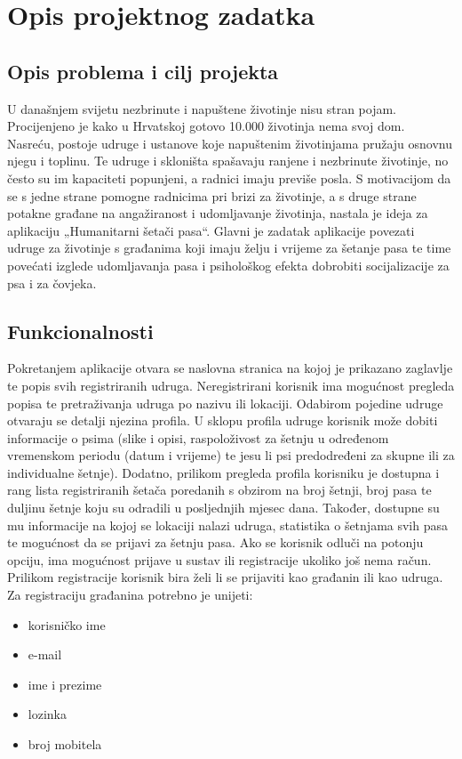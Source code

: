 \chapter{Opis projektnog zadatka}
		
		\section{Opis problema i cilj projekta}
		U današnjem svijetu nezbrinute i napuštene životinje nisu stran pojam. Procijenjeno je kako u Hrvatskoj gotovo 10.000 životinja nema svoj dom. Nasreću, postoje udruge i ustanove koje napuštenim životinjama pružaju osnovnu njegu i toplinu. Te udruge i skloništa spašavaju ranjene i nezbrinute životinje, no često su im kapaciteti popunjeni, a radnici imaju previše posla. S motivacijom da se s jedne strane pomogne radnicima pri brizi za životinje, a s druge strane potakne građane na angažiranost i udomljavanje životinja, nastala je ideja za aplikaciju „Humanitarni šetači pasa“. Glavni je zadatak aplikacije povezati udruge za životinje s građanima koji imaju želju i vrijeme za šetanje pasa te time povećati izglede udomljavanja pasa i psihološkog efekta dobrobiti socijalizacije za psa i za čovjeka.
		
		
		\section{Funkcionalnosti}
		Pokretanjem aplikacije otvara se naslovna stranica na kojoj je prikazano zaglavlje te popis svih registriranih udruga.
		\newline
		Neregistrirani korisnik ima mogućnost pregleda popisa te pretraživanja udruga po nazivu ili lokaciji. Odabirom pojedine udruge otvaraju se detalji njezina profila. U sklopu profila udruge korisnik može dobiti informacije o psima (slike i opisi, raspoloživost za šetnju u određenom vremenskom periodu (datum i vrijeme) te jesu li psi predodređeni za skupne ili za individualne šetnje). Dodatno, prilikom pregleda profila korisniku je dostupna i rang lista registriranih šetača poredanih s obzirom na broj šetnji, broj pasa te duljinu šetnje koju su odradili u posljednjih mjesec dana. Također, dostupne su mu informacije na kojoj se lokaciji nalazi udruga, statistika o šetnjama svih pasa te mogućnost da se prijavi za šetnju pasa. Ako se korisnik odluči na potonju opciju, ima mogućnost prijave u sustav ili registracije ukoliko još nema račun.
		\newline
		Prilikom registracije korisnik bira želi li se prijaviti kao građanin ili kao udruga.
		\newline
		\newline
		Za registraciju građanina potrebno je unijeti:
		\begin{itemize}
			\item korisničko ime
			\item e-mail
			\item ime i prezime
			\item lozinka
			\item broj mobitela
		\end{itemize}
		
